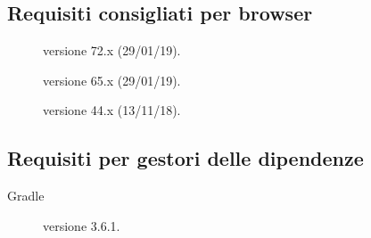 \documentclass[../../../manuale-sviluppatore.tex]{subfiles}
\begin{document}
\subsection{Requisiti consigliati per browser}%
\label{sub:requisiti_consigliati per browser}

\begin{description}
  \item[] versione 72.x (29/01/19).
  \item[] versione 65.x (29/01/19).
  \item[] versione 44.x (13/11/18).
\end{description}

\subsection{Requisiti per gestori delle dipendenze}%
\label{sub:requisiti_per_gestori_delle_dipendenze}

\begin{description}
  \item[Gradle] versione 3.6.1.
\end{description}
\end{document}
